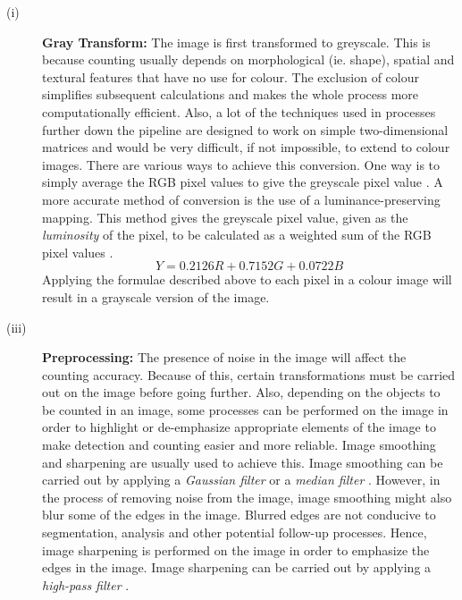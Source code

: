 \begin{description}
\item[(i)] \textbf{Gray Transform:} The image is first transformed to greyscale. This is because counting usually depends on morphological (ie. shape), spatial and textural features that have no use for colour. The exclusion of colour simplifies subsequent calculations and makes the whole process more computationally efficient. Also, a lot of the techniques used in processes further down the pipeline are designed to work on simple two-dimensional matrices and would be very difficult, if not impossible, to extend to colour images. There are various ways to achieve this conversion. One way is to simply average the RGB pixel values to give the greyscale pixel value \cite{REF2}. A more accurate method of conversion is the use of a luminance-preserving mapping. This method gives the greyscale pixel value, given as the \textit{luminosity} of the pixel, to be calculated as a weighted sum of the RGB pixel values \cite{REF3}.
\begin{equation}
Y = 0.2126R + 0.7152G + 0.0722B
\label{eqn:luminosity}
\end{equation}
Applying the formulae described above to each pixel in a colour image will result in a grayscale version of the image.\\ 

\item[(iii)] \textbf{Preprocessing:} The presence of noise in the image will affect the counting accuracy. Because of this, certain transformations must be carried out on the image before going further. Also, depending on the objects to be counted in an image, some processes can be performed on the image in order to highlight or de-emphasize appropriate elements of the image to make detection and counting easier and more reliable. Image smoothing and sharpening are usually used to achieve this. Image smoothing can be carried out by applying a \textit{Gaussian filter} \cite{REF4} or a \textit{median filter} \cite{REF5}. However, in the process of removing noise from the image, image smoothing might also blur some of the edges in the image. Blurred edges are not conducive to segmentation, analysis and other potential follow-up processes. Hence, image sharpening is performed on the image in order to emphasize the edges in the image. Image sharpening can be carried out by applying a \textit{high-pass filter} \cite{REF6}.\\


\end{description}
